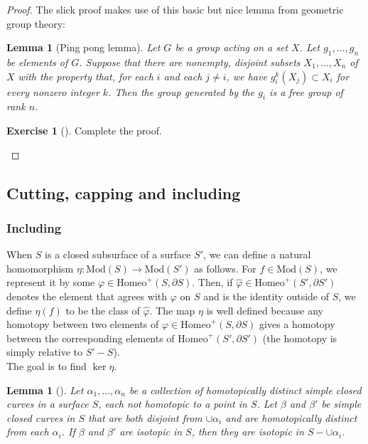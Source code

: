 \documentclass[reqno]{amsart}
\newtheorem{lemma}[theorem]{Lemma}
\theoremstyle{definition}
\newtheorem{exercise}[theorem]{Exercise}
\theoremstyle{remark}
\newcommand{\Mod}{{\mathrm{Mod}}}
\newcommand{\Homeo}{{\mathrm{Homeo}}}
\begin{document}
\begin{proof}
   The slick proof makes use of this basic but nice
   lemma from geometric group theory:

\begin{lemma}[Ping pong lemma]
    Let $G$ be a group acting on a set $X$. Let
    $g_1, \ldots, g_n$ be elements of $G$. Suppose
    that there are nonempty, disjoint subsets $X_1, \ldots,
    X_n$ of $X$ with the property that, for each
    $i$ and each $j\neq i$, we have
    $g_i^{k} \left( X_j  \right) \subset X_i$ for every
    nonzero integer $k$. Then the group generated
    by the $g_i$ is a free group of rank $n$.
\end{lemma}

\begin{exercise}[]
    Complete the proof.
\end{exercise}


\end{proof}


\subsection{Cutting, capping and including}

\subsubsection{Including}

When $S$ is a closed subsurface of a surface $S'$, we
can define a natural homomorphism $\eta \colon
\Mod(S) \to \Mod(S')$ as follows. For
$f \in \Mod(S)$, we represent it by some
$\varphi \in \Homeo^{+} \left( S, \partial S \right) $. Then,
if $\hat{\varphi} \in \Homeo^{+} \left( S', \partial S' \right) $ 
denotes the element that agrees with $\varphi $ on $S$ and
is the identity outside of $S$, we define
$\eta (f)$ to be the class of $\hat{\varphi }$. The map
$\eta $ is well defined because any homotopy
between two elements of $\varphi \in \Homeo^{+} (S, \partial
S)$ gives a homotopy between the corresponding elements
of $\Homeo^{+}\left( S', \partial S' \right) $ (the homotopy
is simply relative to $S' - S$).\\
\linebreak
The goal is to find $\ker \eta$.

\begin{lemma}[]
    Let $\alpha_1, \ldots, \alpha_n$  be a collection of
    homotopically distinct simple closed curves in a surface
    $S$, each not homotopic to a point in $S$. Let
    $ \beta $ and $\beta'$ be simple closed curves in $S$ that
    are both disjoint from $\cup  \alpha_i $ and are
    homotopically distinct from each $\alpha_i$. If
    $\beta$ and $\beta'$ are isotopic in $S$, then
    they are isotopic in $S- \cup \alpha_i$.
\end{lemma}
\end{document}
